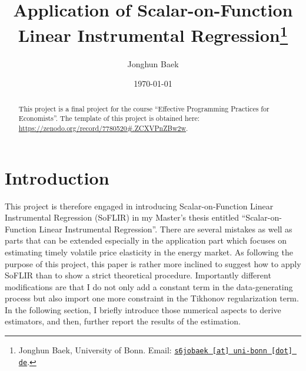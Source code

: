 \documentclass[11pt, a4paper, leqno]{article}
\begin{document}
\title{Application of Scalar-on-Function Linear Instrumental Regression\thanks{Jonghun Baek, University of Bonn. Email: \href{mailto:s6jobaek@uni-bonn.de}{\nolinkurl{s6jobaek [at] uni-bonn [dot] de}}.}}

\author{Jonghun Baek}

\date{
    \today
}

\maketitle


\begin{abstract}
    This project is a final project for the course ``Effective Programming Practices for Economists''. The template of this project is obtained here: \url{https://zenodo.org/record/7780520#.ZCXVPnZBw2w}.
\end{abstract}

\clearpage


\section{Introduction} %
This project is therefore engaged in introducing Scalar-on-Function Linear Instrumental Regression (SoFLIR) in my Master's thesis entitled ``Scalar-on-Function Linear Instrumental Regression''. There are several mistakes as well as parts that can be extended especially in the application part which focuses on estimating timely volatile price elasticity in the energy market. As following the purpose of this project, this paper is rather more inclined to suggest how to apply SoFLIR than to show a strict theoretical procedure. Importantly different modifications are that I do not only add a constant term in the data-generating process but also import one more constraint in the Tikhonov regularization term. In the following section, I briefly introduce those numerical aspects to derive estimators, and then, further report the results of the estimation.
\end{document}
